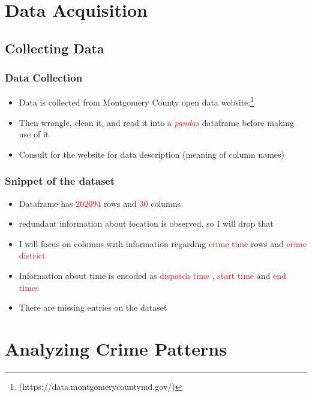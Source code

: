 \documentclass[usenames,dvipsnames]{beamer}
\begin{document}
\section{Data Acquisition}
\subsection{Collecting Data}
\begin{frame}
\frametitle{Data Collection}
\begin{itemize} 
\item Data is collected from Montgomery County open data website:\footnote{(https://data.montgomerycountymd.gov/)}
\item Then wrangle, clean it, and read it into a \textcolor{red}{\emph{pandas}} dataframe before making use of it 
\item Consult for the website for data description (meaning of column names)
\end{itemize}
\end{frame}

\begin{frame}
\frametitle{Snippet of the dataset}
\begin{itemize}
\item Dataframe has \textcolor{red}{202094} rows and \textcolor{red}{30} columns
\item redundant information about location is observed, so I will drop that
\item I will focus on columns with information regarding \textcolor{red}{ crime time} rows and \textcolor{red}{crime district} 
\item Information about time is encoded as \textcolor{red}{ dispatch time} , \textcolor{red}{ start time} and \textcolor{red}{end times} 
\item There are missing entries on the dataset
\end{itemize}

\end{frame}
\section{Analyzing Crime Patterns}
\end{document}
